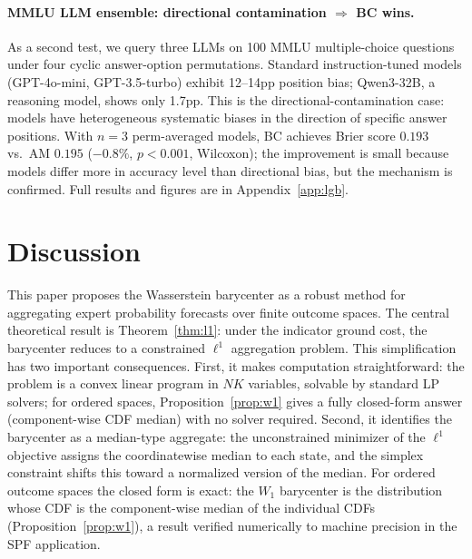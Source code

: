 \paragraph{MMLU LLM ensemble: directional contamination $\Rightarrow$ BC wins.}
As a second test, we query three LLMs on 100 MMLU multiple-choice questions under four cyclic answer-option permutations.  Standard instruction-tuned models (GPT-4o-mini, GPT-3.5-turbo) exhibit 12--14pp position bias; Qwen3-32B, a reasoning model, shows only 1.7pp.  This is the directional-contamination case: models have heterogeneous systematic biases in the direction of specific answer positions.  With $n=3$ perm-averaged models, BC achieves Brier score $0.193$ vs.\ AM $0.195$ ($-0.8\%$, $p<0.001$, Wilcoxon); the improvement is small because models differ more in accuracy level than directional bias, but the mechanism is confirmed.  Full results and figures are in Appendix~\ref{app:lgb}.

\section{Discussion}
\label{sec:discussion}

This paper proposes the Wasserstein barycenter as a robust method for aggregating expert probability forecasts over finite outcome spaces.  The central theoretical result is Theorem~\ref{thm:l1}: under the indicator ground cost, the barycenter reduces to a constrained $\ell^1$ aggregation problem.  This simplification has two important consequences.  First, it makes computation straightforward: the problem is a convex linear program in $NK$ variables, solvable by standard LP solvers; for ordered spaces, Proposition~\ref{prop:w1} gives a fully closed-form answer (component-wise CDF median) with no solver required.  Second, it identifies the barycenter as a median-type aggregate: the unconstrained minimizer of the $\ell^1$ objective assigns the coordinatewise median to each state, and the simplex constraint shifts this toward a normalized version of the median.  For ordered outcome spaces the closed form is exact: the $W_1$ barycenter is the distribution whose CDF is the component-wise median of the individual CDFs (Proposition~\ref{prop:w1}), a result verified numerically to machine precision in the SPF application.

